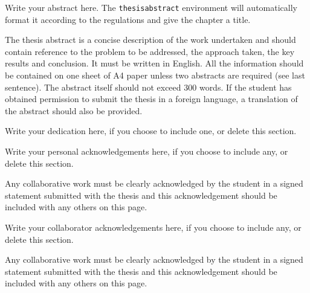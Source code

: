 \begin{thesisfrontmatter}
\begin{thesisabstract}

Write your abstract here. The \texttt{thesisabstract} environment will automatically format it according to the regulations and give the chapter a title. 

The thesis abstract is a concise description of the work 
undertaken and should contain reference to the problem to be 
addressed, the approach taken, the key results and conclusion. It must 
be written in English. All the information 
should be contained on one sheet of A4 paper unless two abstracts are required (see last sentence). The abstract itself should not exceed 300 words. If the student has obtained permission to submit the thesis in a foreign 
language, a translation of the abstract should also be provided.

\end{thesisabstract}

\begin{thesisdedication}

    Write your dedication here, if you choose to include one, or delete this section.\\

\end{thesisdedication}

\begin{thesisacknowledgements}[0]

Write your personal acknowledgements here, if you choose to include any, or delete this section.

Any collaborative work must be clearly acknowledged by the student in a signed statement submitted with the thesis and this acknowledgement should be included with any others on this page.

\end{thesisacknowledgements}

\begin{thesisacknowledgements}[1]

Write your collaborator acknowledgements here, if you choose to include any, or delete this section.

Any collaborative work must be clearly acknowledged by the student in a signed statement submitted with the thesis and this acknowledgement should be included with any others on this page.


\end{thesisacknowledgements}
\end{thesisfrontmatter}
